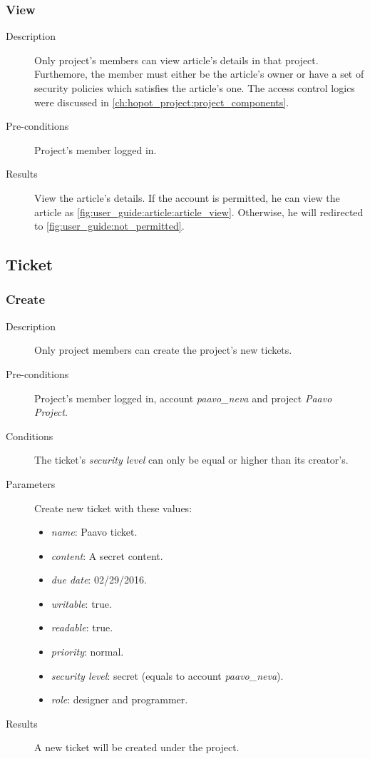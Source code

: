 \clearpage

\subsubsection{View}
\label{ch:appendix-a:user_guide:article:list}

\begin{description}
\item[Description] Only project's members can view article's details in that project.
Furthemore, the member must either be the article's owner or have a set of security policies which satisfies the article's one.
The access control logics were discussed in \autoref{ch:hopot_project:project_components}.
\item[Pre-conditions] Project's member logged in.
\item[Results] View the article's details.
If the account is permitted, he can view the article as \autoref{fig:user_guide:article:article_view}.
Otherwise, he will redirected to \autoref{fig:user_guide:not_permitted}.
\end{description}

\subsection{Ticket}
\label{ch:appendix-a:user_guide:ticket}
\subsubsection{Create}
\label{ch:appendix-a:user_guide:ticket:create}

\begin{description}
\item[Description] Only project members can create the project's new tickets.
\item[Pre-conditions] Project's member logged in, \eg account \emph{paavo\_neva} and project \emph{Paavo Project}.
\item[Conditions] The ticket's \emph{security level} can only be equal or higher than its creator's.
\item[Parameters] Create new ticket with these values:
\begin{itemize}
\item \emph{name}: Paavo ticket.
\item \emph{content}: A secret content.
\item \emph{due date}: 02/29/2016.
\item \emph{writable}: true.
\item \emph{readable}: true.
\item \emph{priority}: normal.
\item \emph{security level}: secret (equals to account \emph{paavo\_neva}).
\item \emph{role}: designer and programmer.
\end{itemize}
\item[Results] A new ticket will be created under the project.
\end{description}

